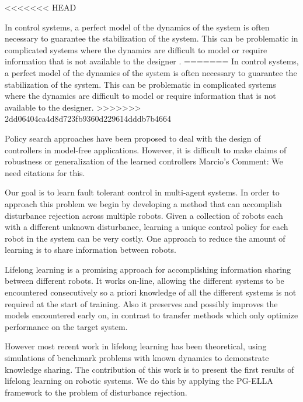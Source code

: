 \documentclass{aamas2016}
\begin{document}
<<<<<<< HEAD

In control systems, a perfect model of the dynamics of the system is often necessary to guarantee the stabilization of the system. 
This can be problematic in complicated systems where the dynamics are difficult to model or require information that is not available to 
the designer \cite{Khalil-2002,Tempo-2013}. %
=======
In control systems, a perfect model of the dynamics of the system is often necessary to guarantee the stabilization of the system. This can be problematic in complicated systems where the dynamics are difficult to model or require information that is not available to the designer. %
>>>>>>> 2dd06404ca4d8d723fb9360d229614dddb7b4664


Policy search approaches have been proposed to deal with the design of controllers in model-free applications.
However, it is difficult to make claims of robustness or generalization of the learned controllers {\color{red} Marcio's Comment: 
We need citations for this}.

Our goal is to learn fault tolerant control in multi-agent systems. In order to approach this problem we begin by developing a method that can accomplish disturbance rejection across multiple robots. 
Given a collection of robots each with a different unknown disturbance, learning a unique control policy for each robot in the system can be very costly. One approach to reduce the amount of learning is to share information between robots. 

Lifelong learning \cite{Ruvolo2013} is a promising approach for accomplishing information sharing between different robots. It works on-line, allowing the different systems to be encountered consecutively so a priori knowledge of all the different systems is not required at the start of training. Also it preserves and possibly improves the models encountered early on, in contrast to transfer methods which only optimize performance on the target system.

However most recent work in lifelong learning \cite{Ruvolo2013,BouAmmar2014a,bouAmmar2015unsupervised} has been theoretical, using simulations of benchmark problems with known dynamics to demonstrate knowledge sharing. The contribution of this work is to present the first results of lifelong learning on robotic systems. We do this by applying the PG-ELLA framework \cite{BouAmmar2014a} to the problem of disturbance rejection.
\end{document}
